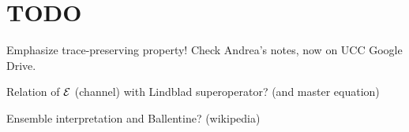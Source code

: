 \section{TODO}
Emphasize trace-preserving property! Check Andrea's notes, now on UCC Google Drive.

Relation of $\mathcal{E}$ (channel) with Lindblad superoperator? (and master equation)

Ensemble interpretation and Ballentine? (wikipedia)
